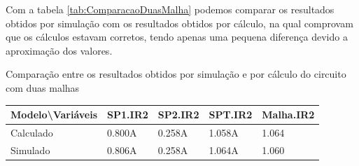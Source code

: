 Com a tabela \ref{tab:ComparacaoDuasMalha} podemos comparar os resultados obtidos por simulação com os resultados obtidos por cálculo, na qual comprovam que os cálculos estavam corretos, tendo apenas uma pequena diferença devido a aproximação dos valores.

\begin{quadro}[H]
    \centering
    \caption{Comparação entre os resultados obtidos por simulação e por cálculo do circuito com duas malhas}
    \begin{tabular}{|C{0.35\textwidth}|C{0.14\textwidth}|C{0.14\textwidth}|C{0.14\textwidth}|C{0.14\textwidth}|}
        \hline
        \textbf{Modelo\textbackslash{}Variáveis} & \textbf{SP1.IR2} & \textbf{SP2.IR2} & \textbf{SPT.IR2} & \textbf{Malha.IR2} \\
        \hline
        Calculado & 0.800A & 0.258A & 1.058A & 1.064 \\
        \hline
        Simulado & 0.806A & 0.258A & 1.064A & 1.060 \\
        \hline
    \end{tabular}
    \vspace{-0.6cm}
    \label{tab:ComparacaoDuasMalha}
\end{quadro}
